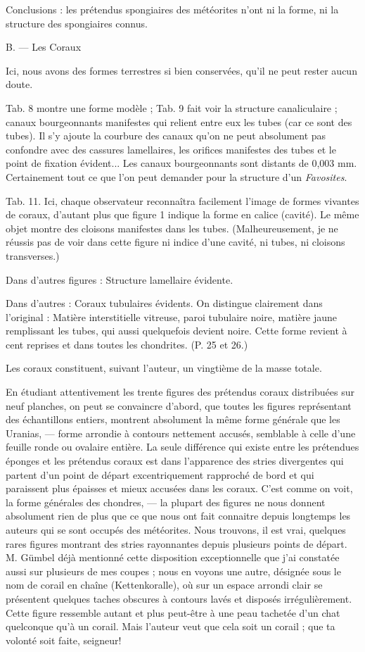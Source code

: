 \documentclass[a4paper, 12pt, oneside, french]{article}
\begin{document}
Conclusions : les prétendus spongiaires des météorites n'ont ni la forme, ni la structure des spongiaires connus.

\og B. --- Les Coraux \fg

\og Ici, nous avons des formes terrestres si bien conservées, qu'il ne peut rester aucun doute. \fg

\og Tab. 8 montre une forme modèle ; Tab. 9 fait voir la structure canaliculaire ; canaux bourgeonnants manifestes qui relient entre eux les tubes (car ce sont des tubes). Il s'y ajoute la courbure des canaux qu'on ne peut absolument pas confondre avec des cassures lamellaires, les orifices manifestes des tubes et le point de fixation évident... Les canaux bourgeonnants sont distants de 0,003 mm. Certainement tout ce que l'on peut demander pour la structure d'un \emph{Favosites}. \fg

\og Tab. 11. Ici, chaque observateur reconnaîtra facilement l'image de formes vivantes de coraux, d'autant plus que figure 1 indique la forme en calice (cavité). Le même objet montre des cloisons manifestes dans les tubes. \fg (Malheureusement, je ne réussis pas de voir dans cette figure ni indice d'une cavité, ni tubes, ni cloisons transverses.)

Dans d'autres figures : \og Structure lamellaire évidente. \fg

Dans d'autres : \og Coraux tubulaires évidents. On distingue clairement dans l'original : Matière interstitielle vitreuse, paroi tubulaire noire, matière jaune remplissant les tubes, qui aussi quelquefois devient noire. Cette forme revient à cent reprises et dans toutes les chondrites. \fg (P. 25 et 26.)

Les coraux constituent, suivant l'auteur, un vingtième de la masse totale.

En étudiant attentivement les trente figures des prétendus coraux distribuées sur neuf planches, on peut se convaincre d'abord, que toutes les figures représentant des échantillons entiers, montrent absolument la même forme générale que les Uranias, --- forme arrondie à contours nettement accusés, semblable à celle d'une feuille ronde ou ovalaire entière. La seule différence qui existe entre les prétendues éponges et les prétendus coraux est dans l'apparence des stries divergentes qui partent d'un point de départ excentriquement rapproché de bord et qui paraissent plus épaisses et mieux accusées dans les coraux. C'est comme on voit, la forme générales des chondres, --- la plupart des figures ne nous donnent absolument rien de plus que ce que nous ont fait connaitre depuis longtemps les auteurs qui se sont occupés des météorites. Nous trouvons, il est vrai, quelques rares figures montrant des stries rayonnantes depuis plusieurs points de départ. M. Gümbel déjà mentionné cette disposition exceptionnelle que j'ai constatée aussi sur plusieurs de mes coupes ; nous en voyons une autre, désignée sous le nom de \og corail en chaîne \fg (Kettenkoralle), où sur un espace arrondi clair se présentent quelques taches obscures à contours lavés et disposés irrégulièrement. Cette figure ressemble autant et plus peut-être à une peau tachetée d'un chat quelconque qu'à un corail. Mais l'auteur veut que cela soit un corail ; que ta volonté soit faite, seigneur!
\end{document}
